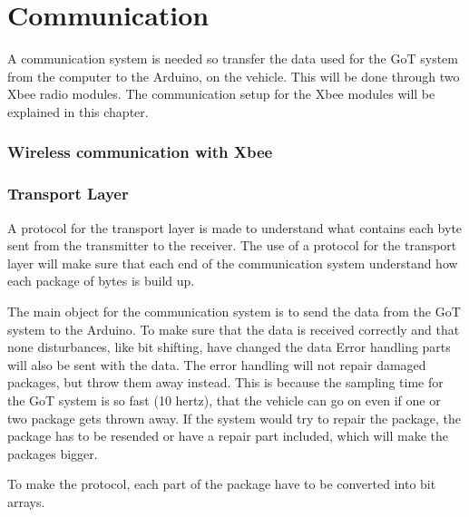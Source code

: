 \chapter{Communication}
A communication system is needed so transfer the data used for the GoT system from the computer to the Arduino, on the vehicle. This will be done through two Xbee radio modules. The communication setup for the Xbee modules will be explained in this chapter.

\subsection{Wireless communication with Xbee}




\subsection{Transport Layer}
A protocol for the transport layer is made to understand what contains each byte sent from the transmitter to the receiver. The use of a protocol for the transport layer will make sure that each end of the communication system understand how each package of bytes is build up.

The main object for the communication system is to send the data from the GoT system to the Arduino. To make sure that the data is received correctly and that none disturbances, like bit shifting, have changed the data Error handling parts will also be sent with the data. The error handling will not repair damaged packages, but throw them away instead. This is because the sampling time for the GoT system is so fast (10 hertz), that the vehicle can go on even if one or two package gets thrown away. If the system would try to repair the package, the package has to be resended or have a repair part included, which will make the packages bigger.

To make the protocol, each part of the package have to be converted into bit arrays.

